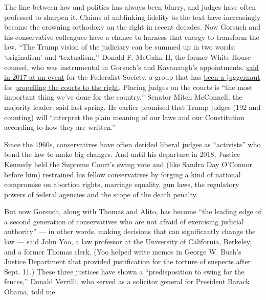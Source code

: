 The line between law and politics has always been blurry, and judges
have often professed to sharpen it. Claims of unblinking fidelity to the
text have increasingly become the crowning orthodoxy on the right in
recent decades. Now Gorsuch and his conservative colleagues have a
chance to harness that energy to transform the law. ``The Trump vision
of the judiciary can be summed up in two words: `originalism' and
`textualism,'' Donald F. McGahn II, the former White House counsel, who
was instrumental in Gorsuch's and Kavanaugh's appointments,
\href{https://www.c-span.org/video/?437462-8/2017-national-lawyers-convention-white-house-counsel-mcgahn}{said
in 2017 at an event} for the Federalist Society, a group that has
\href{https://www.washingtonpost.com/graphics/2019/investigations/leonard-leo-federalists-society-courts/?itid=lk_inline_manual_1}{been
a juggernaut} for
\href{https://www.nytimes3xbfgragh.onion/2018/08/22/magazine/trump-remaking-courts-judiciary.html}{propelling
the courts to the right}. Placing judges on the courts is ``the most
important thing we've done for the country,'' Senator Mitch McConnell,
the majority leader, said last spring. He earlier promised that Trump
judges (192 and counting) will ``interpret the plain meaning of our laws
and our Constitution according to how they are written.''

Since the 1960s, conservatives have often derided liberal judges as
``activists'' who bend the law to make big changes. And until his
departure in 2018, Justice Kennedy held the Supreme Court's swing vote
and (like Sandra Day O'Connor before him) restrained his fellow
conservatives by forging a kind of national compromise on abortion
rights, marriage equality, gun laws, the regulatory powers of federal
agencies and the scope of the death penalty.

But now Gorsuch, along with Thomas and Alito, has become ``the leading
edge of a second generation of conservatives who are not afraid of
exercising judicial authority'' --- in other words, making decisions
that can significantly change the law --- said John Yoo, a law professor
at the University of California, Berkeley, and a former Thomas clerk.
(Yoo helped write memos in George W. Bush's Justice Department that
provided justification for the torture of suspects after Sept. 11.)
These three justices have shown a ``predisposition to swing for the
fences,'' Donald Verrilli, who served as a solicitor general for
President Barack Obama, told me.

